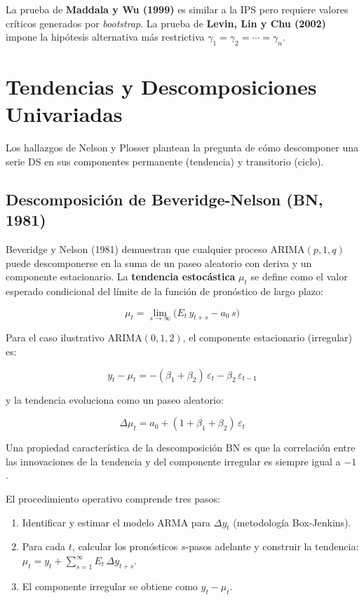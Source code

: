 \documentclass[12pt]{article}
\begin{document}
La prueba de \textbf{Maddala y Wu (1999)} es similar a la IPS pero requiere
valores cr\'iticos generados por \textit{bootstrap}. La prueba de
\textbf{Levin, Lin y Chu (2002)} impone la hip\'otesis alternativa m\'as
restrictiva $\gamma_1 = \gamma_2 = \cdots = \gamma_n$.

\section{Tendencias y Descomposiciones Univariadas}

Los hallazgos de Nelson y Plosser plantean la pregunta de c\'omo descomponer
una serie DS en sus componentes permanente (tendencia) y transitorio (ciclo).

\subsection{Descomposici\'on de Beveridge-Nelson (BN, 1981)}

Beveridge y Nelson (1981) demuestran que cualquier proceso ARIMA$(p,1,q)$
puede descomponerse en la suma de un paseo aleatorio con deriva y un
componente estacionario. La \textbf{tendencia estoc\'astica} $\mu_t$ se
define como el valor esperado condicional del l\'imite de la funci\'on de
pron\'ostico de largo plazo:

\begin{equation}
  \mu_t = \lim_{s\to\infty}\bigl(E_t\,y_{t+s} - a_0\,s\bigr)
\end{equation}

Para el caso ilustrativo ARIMA$(0,1,2)$, el componente estacionario
(irregular) es:

\begin{equation}
  y_t - \mu_t = -(\beta_1+\beta_2)\,\varepsilon_t - \beta_2\,\varepsilon_{t-1}
\end{equation}

y la tendencia evoluciona como un paseo aleatorio:

\begin{equation}
  \Delta\mu_t = a_0 + (1+\beta_1+\beta_2)\,\varepsilon_t
\end{equation}

Una propiedad caracter\'istica de la descomposici\'on BN es que la
correlaci\'on entre las innovaciones de la tendencia y del componente
irregular es siempre igual a $-1$.

El procedimiento operativo comprende tres pasos:
\begin{enumerate}
  \item Identificar y estimar el modelo ARMA para $\Delta y_t$
        (metodolog\'ia Box-Jenkins).
  \item Para cada $t$, calcular los pron\'osticos $s$-pasos adelante y
        construir la tendencia: $\mu_t = y_t + \sum_{s=1}^{\infty}E_t\,\Delta y_{t+s}$.
  \item El componente irregular se obtiene como $y_t - \mu_t$.
\end{enumerate}
\end{document}
